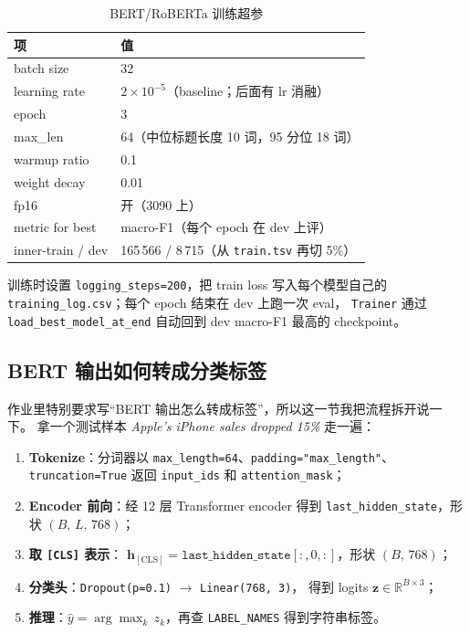 \documentclass{SYSUReport}
\begin{document}
\begin{table}[!htbp]
\centering
\caption{BERT/RoBERTa 训练超参}
\label{tab:bert-hparam}
\begin{tabular}{ll}
\toprule
项 & 值 \\
\midrule
batch size & 32 \\
learning rate & $2 \times 10^{-5}$（baseline；后面有 lr 消融） \\
epoch & 3 \\
max\_len & 64（中位标题长度 10 词，95 分位 18 词） \\
warmup ratio & 0.1 \\
weight decay & 0.01 \\
fp16 & 开（3090 上） \\
metric for best & macro-F1（每个 epoch 在 dev 上评） \\
inner-train / dev & 165\,566 / 8\,715（从 \texttt{train.tsv} 再切 5\%） \\
\bottomrule
\end{tabular}
\end{table}

训练时设置 \texttt{logging\_steps=200}，把 train loss 写入每个模型自己的
\texttt{training\_log.csv}；每个 epoch 结束在 dev 上跑一次 eval，
\texttt{Trainer} 通过 \texttt{load\_best\_model\_at\_end} 自动回到
dev macro-F1 最高的 checkpoint。

\subsection{BERT 输出如何转成分类标签}

作业里特别要求写“BERT 输出怎么转成标签”，所以这一节我把流程拆开说一下。
拿一个测试样本 \emph{Apple's iPhone sales dropped 15\%} 走一遍：

\begin{enumerate}
    \item \textbf{Tokenize}：分词器以 \texttt{max\_length=64}、\texttt{padding="max\_length"}、
          \texttt{truncation=True} 返回 \texttt{input\_ids} 和 \texttt{attention\_mask}；
    \item \textbf{Encoder 前向}：经 12 层 Transformer encoder 得到 \texttt{last\_hidden\_state}，形状 $(B,\,L,\,768)$；
    \item \textbf{取 \texttt{[CLS]} 表示}：
          $\mathbf{h}_{\mathrm{[CLS]}} = \texttt{last\_hidden\_state}[:, 0, :]$，形状 $(B,\,768)$；
    \item \textbf{分类头}：\texttt{Dropout(p=0.1)} $\to$ \texttt{Linear(768, 3)}，
          得到 logits $\mathbf{z}\in\mathbb{R}^{B \times 3}$；
    \item \textbf{推理}：$\hat{y}=\arg\max_k\, z_k$，再查 \texttt{LABEL\_NAMES} 得到字符串标签。
\end{enumerate}
\end{document}
